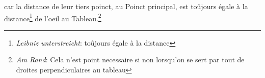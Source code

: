 \pend \pstart [p.~10] [...] car la distance de leur tiers poinct, au Poinct principal, est toûjours \'{e}gale \`{a} la distance\footnote{\textit{Leibniz unterstreicht}: to\^{u}jours \'{e}gale \`{a} la distance} de l'oeil au Tableau.\footnote{\textit{Am Rand}: Cela n'est point necessaire si non lorsqu'on se sert par tout de droites perpendiculaires au tableau}